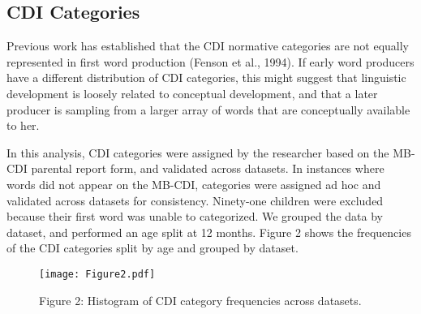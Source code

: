 \documentclass[10pt,letterpaper]{article}
\begin{document}
\subsection{CDI Categories} 
Previous work has established that the CDI normative categories are not equally represented in first word production (Fenson et al., 1994). If early word producers have a different distribution of CDI categories, this might suggest that linguistic development is loosely related to conceptual development, and that a later producer is sampling from a larger array of words that are conceptually available to her.\par
In this analysis, CDI categories were assigned by the researcher based on the MB-CDI parental report form, and validated across datasets. In instances where words did not appear on the MB-CDI,  categories were assigned ad hoc and validated across datasets for consistency. Ninety-one children were excluded because their first word was unable to categorized. We grouped the data by dataset, and performed an age split at 12 months. Figure 2 shows the frequencies of the CDI categories split by age and grouped by dataset.

\begin{figure}[t]
\begin{center}
\texttt{[image: Figure2.pdf]}
\end{center}
\caption{Figure 2: Histogram of CDI category frequencies across datasets.}
\end{figure}
\end{document}
